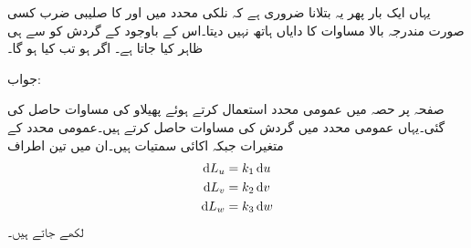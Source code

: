 یہاں ایک بار پھر یہ بتلانا ضروری ہے کہ نلکی محدد میں  اور  کا صلیبی ضرب کسی صورت مندرجہ بالا مساوات کا دایاں ہاتھ نہیں دیتا۔اس کے باوجود  کے  گردش کو  سے ہی ظاہر کیا جاتا ہے۔ 
اگر  ہو تب  کیا ہو گا۔

جواب:

صفحہ  پر حصہ  میں عمومی محدد استعمال کرتے ہوئے پھیلاو کی مساوات حاصل کی گئی۔یہاں عمومی محدد میں گردش کی مساوات حاصل کرتے ہیں۔عمومی محدد کے متغیرات  جبکہ اکائی سمتیات  ہیں۔ان میں تین اطراف
\begin{align*}
\dif L_u &= k_1 \dif u \\
\dif L_v &= k_2 \dif v \\
\dif L_w &= k_3 \dif w 
\end{align*}
لکھے جاتے ہیں۔

